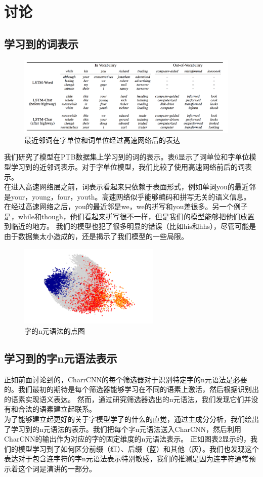\section{讨论}
\subsection{学习到的词表示}
\begin{figure}[h]
  \centering
  \includegraphics[width=0.95\textwidth]{./images/table6}
  \caption{最近邻词在字单位和词单位经过高速网络后的表达}
\end{figure}
我们研究了模型在PTB数据集上学习到的词的表示。表6显示了词单位和字单位模型学习到的近邻词表示。对于字单位模型，我们比较了使用高速网络前后的词表示。\\
在进入高速网络层之前，词表示看起来只依赖于表面形式，例如单词you的最近邻是your，young，four，youth。高速网络似乎能够编码和拼写无关的语义信息。
在经过高速网络之后，you的最近邻是we，we的拼写和you差很多。另一个例子是，while和though，他们看起来拼写很不一样，但是我们的模型能够把他们放置到临近的地方。
我们的模型也犯了很多明显的错误（比如his和hhs），尽管可能是由于数据集太小造成的，还是揭示了我们模型的一些局限。\\
\begin{figure}[h]
  \centering
  \includegraphics[width=0.6\textwidth]{./images/figure2}
  \caption{字的n元语法的点图}
\end{figure}
\subsection{学习到的字n元语法表示}
正如前面讨论到的，CharrCNN的每个筛选器对于识别特定字的n元语法是必要的。我们最初的期待是每个筛选器能够学习在不同的语素上激活，然后根据识别出的语素实现语义表达。
然而，通过研究筛选器选出的n元语法，我们发现它们并没有和合法的语素建立起联系。\\
为了能够建立起更好的关于字模型学了的什么的直觉，通过主成分分析，我们绘出了学习到的n元语法的表示。我们把每个字n元语法送入CharCNN，然后利用CharCNN的输出作为对应的字的固定维度的n元语法表示。
正如图表2显示的，我们的模型学习到了如何区分前缀（红）、后缀（蓝）和其他（灰）。我们也发现这个表达对于包含连字符的字n元语法表示特别敏感，我们的推测是因为连字符通常预示着这个词是演讲的一部分。\\

